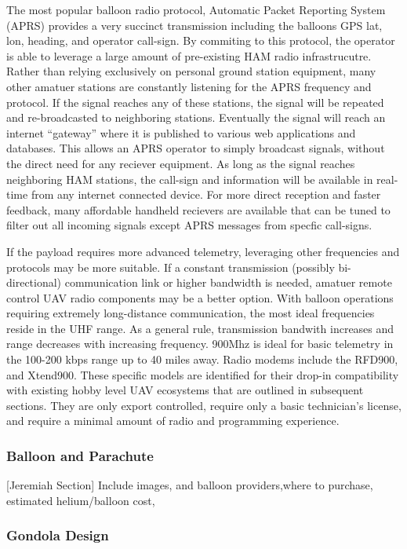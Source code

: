 \documentclass[heading.tex]{subfiles}
\begin{document}
The most popular balloon radio protocol, Automatic Packet Reporting System (APRS)
provides a very succinct transmission including the balloons GPS lat, lon, heading,
and operator call-sign. By commiting to this protocol, the operator is able to
leverage a large amount of pre-existing HAM radio infrastrucutre. Rather than
relying exclusively on personal ground station equipment, many other amatuer
stations are constantly listening for the APRS frequency and protocol. If the
signal reaches any of these stations, the signal will be repeated and re-broadcasted
to neighboring stations. Eventually the signal will reach an internet ``gateway''
where it is published to various web applications and databases.
This allows an APRS operator to simply broadcast signals,
without the direct need for any reciever equipment.
As long as the signal reaches neighboring HAM stations, the call-sign and information
will be available in real-time from any internet connected device.
For more direct reception and faster feedback,
many affordable handheld recievers are available that can
be tuned to filter out all incoming signals except APRS messages from specfic
call-signs.

If the payload requires more advanced telemetry, leveraging other frequencies
and protocols may be more suitable. If a constant transmission
(possibly bi-directional) communication link or higher bandwidth is needed,
amatuer remote control UAV radio components may be a better option.
With balloon operations requiring extremely long-distance communication,
the most ideal frequencies reside in the UHF range.
As a general rule, transmission bandwith increases and range decreases with
increasing frequency. 900Mhz is ideal for
basic telemetry in the 100-200 kbps range up to 40 miles away. Radio modems
include the RFD900, and Xtend900. These specific models are identified for their
drop-in compatibility with existing hobby level UAV ecosystems that are outlined
in subsequent sections. They are only export controlled, require only
a basic technician's license, and require a minimal amount of radio and 
programming experience.

\subsubsection{Balloon and Parachute}

[Jeremiah Section]
Include images, and balloon providers,where to purchase, estimated helium/balloon cost,

\subsubsection{Gondola Design}
\end{document}
